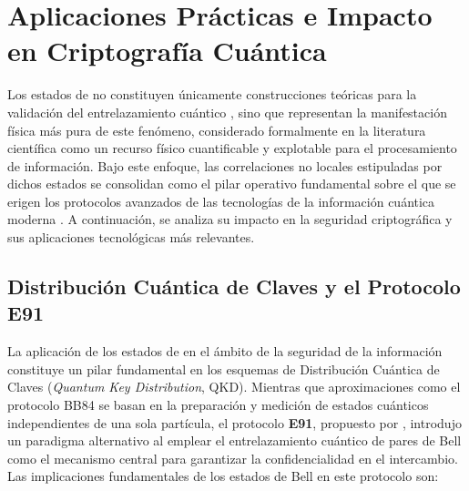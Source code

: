 \documentclass[11pt,a4paper,spanish]{book}
\begin{document}
\section{Aplicaciones Prácticas e Impacto en Criptografía Cuántica}

Los estados de \cite{bell1964} no constituyen únicamente construcciones teóricas para la validación del entrelazamiento cuántico \citep{schrodinger1935}, sino que representan la manifestación física más pura de este fenómeno, considerado formalmente en la literatura científica como un recurso físico cuantificable y explotable para el procesamiento de información. Bajo este enfoque, las correlaciones no locales estipuladas por dichos estados se consolidan como el pilar operativo fundamental sobre el que se erigen los protocolos avanzados de las tecnologías de la información cuántica moderna \citep{nielsen2010}. A continuación, se analiza su impacto en la seguridad criptográfica y sus aplicaciones tecnológicas más relevantes.

\subsection{Distribución Cuántica de Claves y el Protocolo E91}
La aplicación de los estados de \cite{bell1964} en el ámbito de la seguridad de la información constituye un pilar fundamental en los esquemas de Distribución Cuántica de Claves (\emph{Quantum Key Distribution}, QKD). Mientras que aproximaciones como el protocolo BB84 \citep{bennett1984} se basan en la preparación y medición de estados cuánticos independientes de una sola partícula, el protocolo \textbf{E91}, propuesto por \cite{ekert1991}, introdujo un paradigma alternativo al emplear el entrelazamiento cuántico \citep{schrodinger1935} de pares de Bell como el mecanismo central para garantizar la confidencialidad en el intercambio.
Las implicaciones fundamentales de los estados de Bell en este protocolo son:
\end{document}
